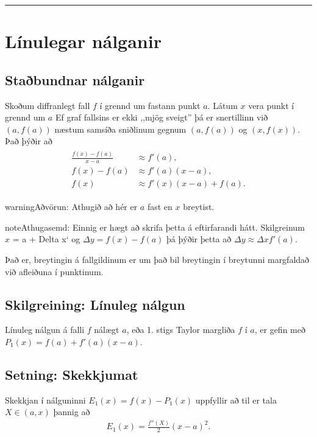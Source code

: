 \documentclass[a4paper,10pt,icelandic]{sphinxmanual}
\begin{document}
\bigskip\hrule{}\bigskip



\section{Línulegar nálganir}
\label{kafli03:linulegar-nalganir}

\subsection{Staðbundnar nálganir}
\label{kafli03:stabundnar-nalganir}
Skoðum diffranlegt fall \(f\) í grennd um fastann punkt
\(a\). Látum \(x\) vera punkt í grennd um \(a\)
Ef graf fallsins er ekki ,,mjög
sveigt” þá er snertillinn við \((a,f(a))\) næstum samsíða
sniðlinum gegnum \((a,f(a))\) og \((x,f(x))\).
Það þýðir að
\begin{equation*}
\begin{split}\begin{aligned}
     \frac{f(x)-f(a)}{x-a} &\approx f'(a),\\
     f(x)-f(a) &\approx  f'(a)(x-a),\\
     f(x) &\approx f'(x)(x-a) + f(a).
\end{aligned}\end{split}
\end{equation*}
\begin{notice}{warning}{Aðvörun:}
Athugið að hér er \(a\) fast en \(x\) breytist.
\end{notice}

\begin{notice}{note}{Athugasemd:}
Einnig er hægt að skrifa þetta á eftirfarandi hátt.
Skilgreinum \(x\) = a + Delta x{}` og
\(\Delta y = f(x) - f(a)\) þá þýðir þetta að
\(\Delta y \approx \Delta x f'(a)\).

Það er, breytingin á fallgildinum er um það bil breytingin í
breytunni margfaldað við afleiðuna í punktinum.
\end{notice}


\subsection{Skilgreining: Línuleg nálgun}
\label{kafli03:skilgreining-linuleg-nalgun}
Línuleg nálgun á falli \(f\) nálægt \(a\), eða 1. stigs Taylor
margliða \(f\) í \(a\), er gefin með
\(P_1(x)=f(a)+f'(a)(x-a)\).


\subsection{Setning: Skekkjumat}
\label{kafli03:setning-skekkjumat}
Skekkjan í nálguninni \(E_1(x)=f(x)-P_1(x)\) uppfyllir að til er
tala \(X \in (a,x)\) þannig að
\begin{equation*}
\begin{split}E_1(x)=\frac{f''(X)}{2}(x-a)^2.\end{split}
\end{equation*}
\end{document}
